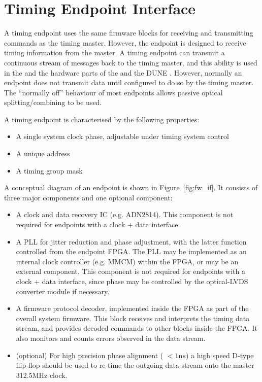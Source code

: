 \documentclass{dune}
\begin{document}
\section{Timing Endpoint Interface}

A timing endpoint uses the same firmware blocks for receiving and transmitting commands as the timing master. However, the endpoint is designed to receive timing information from the master. A timing endpoint can transmit a continuous stream of messages back to the timing master, and this ability is used in the   and the hardware parts of the  and the DUNE . However, normally an endpoint does not transmit data until configured to do so by the timing master. The ``normally off'' behaviour of most endpoints allows passive optical splitting/combining to be used. 

A timing endpoint is characterised by the following properties:

\begin{itemize}
	\item A single system clock phase, adjustable under timing system control
	\item A unique address
	\item A timing group mask
\end{itemize}

A conceptual diagram of an endpoint is shown in Figure~\ref{fig:fw_if}. It consists of three major components and one optional component:

\begin{itemize}
	\item A clock and data recovery IC (e.g. ADN2814). This component is not required for endpoints with a clock + data interface.
	\item A PLL for jitter reduction and phase adjustment, with the latter function controlled from the endpoint FPGA. The PLL may be implemented as an internal clock controller (e.g. MMCM) within the FPGA, or may be an external component. This component is not required for endpoints with a clock + data interface, since phase may be controlled by the optical-LVDS converter module if necessary.
	\item A firmware protocol decoder, implemented inside the FPGA as part of the overall system firmware. This block receives and interprets the timing data stream, and provides decoded commands to other blocks inside the FPGA. It also monitors and counts errors observed in the data stream.
	\item(optional) For high precision phase alignment ( $< 1{\mathrm ns}$) a high speed D-type flip-flop should be used to re-time the outgoing data stream onto the master 312.5MHz clock.
\end{itemize}
\end{document}
